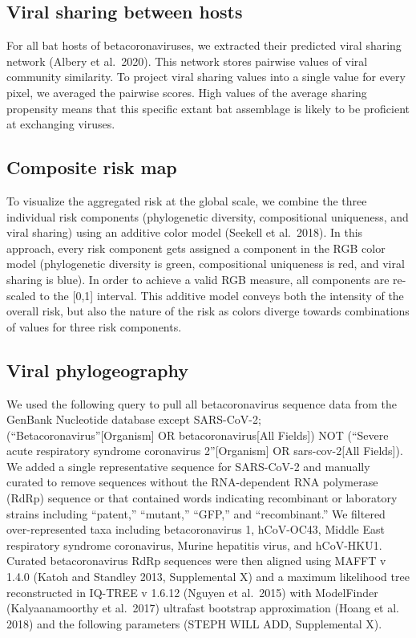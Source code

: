 \documentclass[11pt]{article}
\begin{document}
\hypertarget{viral-sharing-between-hosts}{%
\subsection{Viral sharing between
hosts}\label{viral-sharing-between-hosts}}

For all bat hosts of betacoronaviruses, we extracted their predicted
viral sharing network (Albery et al.~2020). This network stores pairwise
values of viral community similarity. To project viral sharing values
into a single value for every pixel, we averaged the pairwise scores.
High values of the average sharing propensity means that this specific
extant bat assemblage is likely to be proficient at exchanging viruses.

\hypertarget{composite-risk-map}{%
\subsection{Composite risk map}\label{composite-risk-map}}

To visualize the aggregated risk at the global scale, we combine the
three individual risk components (phylogenetic diversity, compositional
uniqueness, and viral sharing) using an additive color model (Seekell et
al.~2018). In this approach, every risk component gets assigned a
component in the RGB color model (phylogenetic diversity is green,
compositional uniqueness is red, and viral sharing is blue). In order to
achieve a valid RGB measure, all components are re-scaled to the
{[}0,1{]} interval. This additive model conveys both the intensity of
the overall risk, but also the nature of the risk as colors diverge
towards combinations of values for three risk components.

\hypertarget{viral-phylogeography}{%
\subsection{Viral phylogeography}\label{viral-phylogeography}}

We used the following query to pull all betacoronavirus sequence data
from the GenBank Nucleotide database except SARS-CoV-2;
(``Betacoronavirus''{[}Organism{]} OR betacoronavirus{[}All Fields{]})
NOT (``Severe acute respiratory syndrome coronavirus 2''{[}Organism{]}
OR sars-cov-2{[}All Fields{]}). We added a single representative
sequence for SARS-CoV-2 and manually curated to remove sequences without
the RNA-dependent RNA polymerase (RdRp) sequence or that contained words
indicating recombinant or laboratory strains including ``patent,''
``mutant,'' ``GFP,'' and ``recombinant.'' We filtered over-represented
taxa including betacoronavirus 1, hCoV-OC43, Middle East respiratory
syndrome coronavirus, Murine hepatitis virus, and hCoV-HKU1. Curated
betacoronavirus RdRp sequences were then aligned using MAFFT v 1.4.0
(Katoh and Standley 2013, Supplemental X) and a maximum likelihood tree
reconstructed in IQ-TREE v 1.6.12 (Nguyen et al.~2015) with ModelFinder
(Kalyaanamoorthy et al.~2017) ultrafast bootstrap approximation (Hoang
et al. 2018) and the following parameters (STEPH WILL ADD, Supplemental
X).
\end{document}
